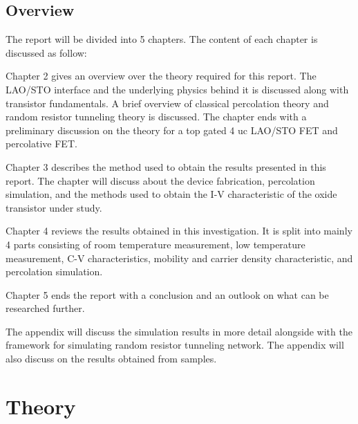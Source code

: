 \documentclass[11pt,a4paper]{report}
\begin{document}
\newpage

\section{Overview}
The report will be divided into 5 chapters. The content of each chapter is discussed as follow:

Chapter 2 gives an overview over the theory required for this report. The LAO/STO interface and the underlying physics behind it is discussed along with transistor fundamentals. A brief overview of classical percolation theory and random resistor tunneling theory is discussed. The chapter ends with a preliminary discussion on the theory for a top gated 4 uc LAO/STO FET and percolative FET.

Chapter 3 describes the method used to obtain the results presented in this report. The chapter will discuss about the device fabrication, percolation simulation, and the methods used to obtain the I-V characteristic of the oxide transistor under study. 

Chapter 4 reviews the results obtained in this investigation. It is split into mainly 4 parts consisting of room temperature measurement, low temperature measurement, C-V characteristics, mobility and carrier density characteristic, and percolation simulation.

Chapter 5 ends the report with a conclusion and an outlook on what can be researched further.

The appendix will discuss the simulation results in more detail alongside with the framework for simulating random resistor tunneling network. The appendix will also discuss on the results obtained from samples.


\chapter{Theory}

\end{document}
